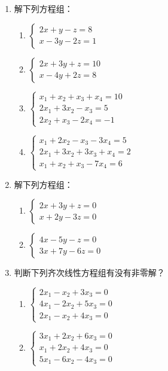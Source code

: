 \begin{enumerate}
\item 解下列方程组：
\begin{multicols}{2}
\begin{enumerate}
    \item $\begin{cases}
        2x+y-z=8\\x-3y-2z=1  
    \end{cases}$
    \item $\begin{cases}
        2x+3y+z=10\\x-4y+2z=8
    \end{cases}$
    \item $\begin{cases}
x_1+x_2+x_3+x_4=10\\
2x_1+3x_2-x_3=5\\
2x_2+x_3-2x_4 =-1       
    \end{cases}$
    \item $\begin{cases}
        x_1+2x_2-x_3-3x_4=5\\
        2x_1+3x_2+3x_3+x_4=2\\
        x_1+x_2+x_3-7x_4=6
    \end{cases}$
\end{enumerate}
\end{multicols}

\item 解下列方程组：
\begin{multicols}{2}
\begin{enumerate}
\item $\begin{cases}
 2x+3y+z=0\\x+2y-3z=0       
\end{cases}$
\item $\begin{cases}
      4x-5y-z=0\\3x+7y-6z=0  
\end{cases}$
\end{enumerate}
\end{multicols}

\item 判断下列齐次线性方程组有没有非零解？
\begin{multicols}{2}
    \begin{enumerate}
    \item $\begin{cases}
     2x_1-x_2+3x_3=0\\
     4x_1-2x_2+5x_3=0\\
     2x_1-x_2+4x_3=0     
    \end{cases}$
    \item $\begin{cases}
     3x_1+2x_2+6x_3=0\\
     x_1+2x_2+4x_3=0\\
     5x_1-6x_2-4x_3=0
    \end{cases}$
    \end{enumerate}
    \end{multicols}


\end{enumerate}
